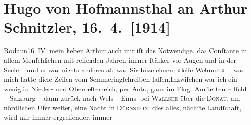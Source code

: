 

         
         \renewcommand{\erwaehntePersonen}{Personen: Hugo von Hofmannsthal, Rudolf Alexander Schröder}
         \renewcommand{\erwaehnteOrte}{Orte: Amstetten, Bad Ischl, Dürnstein, Enns, Niederösterreich, Oberösterreich, Rodaun, Salzburg, Semmering, Wallsee, Wels, Wien}
         \renewcommand{\erwaehnteWerke}{}
               \section[Hugo von Hofmannsthal an Arthur Schnitzler, 16. 4. {[}1914{]}]{ Hugo von Hofmannsthal an Arthur Schnitzler, 16. 4. {[}1914{]}}\nopagebreak{}\rehead{ }\begin{ledgroupsized}[t]{13cm}\normalsize\beginnumbering{} \toendnotes[C]{\smallbreak\pagebreak[2]} 
\toendnotes[C]{\smallbreak}\pstart
           \raggedleft{}{\pb}Rodaun16 IV.\pend
           \pstart{}mein lieber Arthur \pend\pstart
           auch mir iſt das Notwendige, das Conſtante in allem Menſchlichen mit reifenden Jahren
               immer ſtärker vor Augen und in der Seele – und es war nichts anderes als was Sie
               bezeichnen: »leiſe Wehmut« – was mich hatte dieſe Zeilen vom Semmeringſchreiben laſſen.\hspace*{1.5em}Inzwiſchen war ich ein wenig in Nieder- und
                  Oberoeſterreich, {\pb}per Auto, ganz im Flug: Amſtetten – Iſchl – Salzburg – dann zurück nach Wels – Enns, bei \textsc{Wallsee} über die \textsc{Donau}, am nördlichen Ufer weiter, eine Nacht in \textsc{Dürnstein}: dies alles, nächſte Landſchaft, wird mir immer ergreifender, immer

\end{ledgroupsized}
